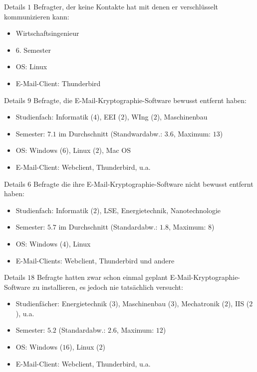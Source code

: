 \documentclass[]{beamer}
\begin{document}
\begin{frame}{Details}
	$1$ Befragter, der keine Kontakte hat mit denen er verschlüsselt kommunizieren kann:
	\begin{itemize}
		\item Wirtschaftsingenieur
		\item $6.$ Semester
		\item OS: Linux
		\item E-Mail-Client: Thunderbird
	\end{itemize}
\end{frame}

\begin{frame}{Details}
	$9$ Befragte, die E-Mail-Kryptographie-Software bewusst entfernt haben:
\begin{itemize}
	\item Studienfach: Informatik ($4$), EEI ($2$), WIng ($2$), Maschinenbau
	\item Semester: $7.1$ im Durchschnitt (Standwardabw.: $3.6$, Maximum: $13$)
	\item OS: Windows ($6$), Linux ($2$), Mac OS
	\item E-Mail-Client: Webclient, Thunderbird, u.a.
\end{itemize}
\end{frame}

\begin{frame}{Details}
	$6$ Befragte die ihre E-Mail-Kryptographie-Software nicht bewusst entfernt haben:
	\begin{itemize}
		\item Studienfach: Informatik ($2$), LSE, Energietechnik, Nanotechnologie
		\item Semester: $5.7$ im Durchschnitt (Standardabw.: $1.8$, Maximum: $8$)
		\item OS: Windows ($4$), Linux
		\item E-Mail-Clients: Webclient, Thunderbird und andere
	\end{itemize}
\end{frame}

\begin{frame}{Details}
	$18$ Befragte hatten zwar schon einmal geplant E-Mail-Kryptographie-Software zu installieren, es jedoch nie tatsächlich versucht:
	\begin{itemize}
		\item Studienfächer: Energietechnik ($3$), Maschinenbau ($3$), Mechatronik ($2$), IIS ($2$), u.a.
		\item Semester: $5.2$ (Standardabw.: $2.6$, Maximum: $12$)
		\item OS: Windows ($16$), Linux ($2$)
		\item E-Mail-Client: Webclient, Thunderbird, u.a.
	\end{itemize}
\end{frame}
\end{document}

